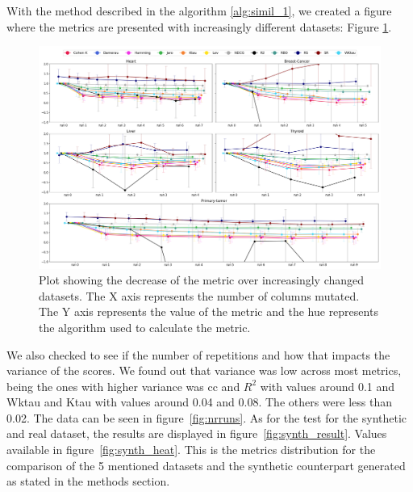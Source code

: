 


With the method described in the algorithm \ref{alg:simil_1}, we created a figure where the metrics are presented with increasingly different datasets: Figure \ref{fig:lineplot}.

\begin{landscape}

\begin{figure}[htbp]
\centering
\caption{Plot showing the decrease of the metric over increasingly changed datasets. The X axis represents the number of columns mutated. The Y axis represents the value of the metric and the hue represents the algorithm used to calculate the metric.}\label{fig:lineplot} 
\includegraphics[scale=0.40]{figures/multiple_datasets_2.png}
\end{figure}
\end{landscape}

We also checked to see if the number of repetitions and how that impacts the variance of the scores. We found out that variance was low across most metrics, being the ones with higher variance was \ac{cc} and $R^2$ with values around 0.1 and Wktau and Ktau with values around 0.04 and 0.08. The others were less than 0.02. The data can be seen in figure~\ref{fig:nrruns}. As for the test for the synthetic and real dataset, the results are displayed in figure~\ref{fig:synth_result}. Values available in figure~\ref{fig:synth_heat}. This is the metrics distribution for the comparison of the 5 mentioned datasets and the synthetic counterpart generated as stated in the methods section.





